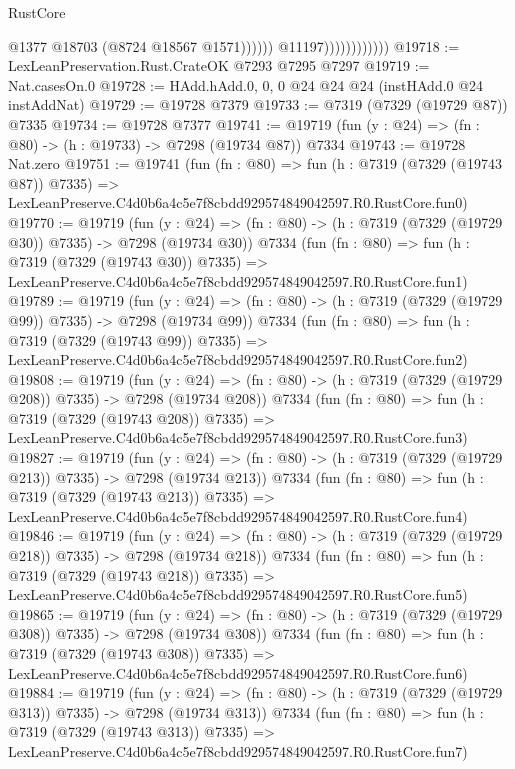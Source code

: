 \begin{lexlean}{RustCore}
\begin{coremodule}
                                      @1377
                                      @18703
                                      (@8724 @18567 @1571))))))
                            @11197))))))))))))
@19718 := LexLeanPreservation.Rust.CrateOK @7293 @7295 @7297
@19719 := Nat.casesOn.{0}
@19728 := HAdd.hAdd.{0, 0, 0} @24 @24 @24 (instHAdd.{0} @24 instAddNat)
@19729 := @19728 @7379
@19733 := @7319 (@7329 (@19729 @87)) @7335
@19734 := @19728 @7377
@19741 := @19719 (fun (y : @24) => (fn : @80) -> (h : @19733) -> @7298 (@19734 @87)) @7334
@19743 := @19728 Nat.zero
@19751 := @19741
    (fun (fn : @80) =>
    fun (h : @7319 (@7329 (@19743 @87)) @7335) =>
    LexLeanPreserve.C4d0b6a4c5e7f8cbdd929574849042597.R0.RustCore.fun0)
@19770 := @19719
    (fun (y : @24) => (fn : @80) -> (h : @7319 (@7329 (@19729 @30)) @7335) -> @7298 (@19734 @30))
    @7334
    (fun (fn : @80) =>
    fun (h : @7319 (@7329 (@19743 @30)) @7335) =>
    LexLeanPreserve.C4d0b6a4c5e7f8cbdd929574849042597.R0.RustCore.fun1)
@19789 := @19719
    (fun (y : @24) => (fn : @80) -> (h : @7319 (@7329 (@19729 @99)) @7335) -> @7298 (@19734 @99))
    @7334
    (fun (fn : @80) =>
    fun (h : @7319 (@7329 (@19743 @99)) @7335) =>
    LexLeanPreserve.C4d0b6a4c5e7f8cbdd929574849042597.R0.RustCore.fun2)
@19808 := @19719
    (fun (y : @24) => (fn : @80) -> (h : @7319 (@7329 (@19729 @208)) @7335) -> @7298 (@19734 @208))
    @7334
    (fun (fn : @80) =>
    fun (h : @7319 (@7329 (@19743 @208)) @7335) =>
    LexLeanPreserve.C4d0b6a4c5e7f8cbdd929574849042597.R0.RustCore.fun3)
@19827 := @19719
    (fun (y : @24) => (fn : @80) -> (h : @7319 (@7329 (@19729 @213)) @7335) -> @7298 (@19734 @213))
    @7334
    (fun (fn : @80) =>
    fun (h : @7319 (@7329 (@19743 @213)) @7335) =>
    LexLeanPreserve.C4d0b6a4c5e7f8cbdd929574849042597.R0.RustCore.fun4)
@19846 := @19719
    (fun (y : @24) => (fn : @80) -> (h : @7319 (@7329 (@19729 @218)) @7335) -> @7298 (@19734 @218))
    @7334
    (fun (fn : @80) =>
    fun (h : @7319 (@7329 (@19743 @218)) @7335) =>
    LexLeanPreserve.C4d0b6a4c5e7f8cbdd929574849042597.R0.RustCore.fun5)
@19865 := @19719
    (fun (y : @24) => (fn : @80) -> (h : @7319 (@7329 (@19729 @308)) @7335) -> @7298 (@19734 @308))
    @7334
    (fun (fn : @80) =>
    fun (h : @7319 (@7329 (@19743 @308)) @7335) =>
    LexLeanPreserve.C4d0b6a4c5e7f8cbdd929574849042597.R0.RustCore.fun6)
@19884 := @19719
    (fun (y : @24) => (fn : @80) -> (h : @7319 (@7329 (@19729 @313)) @7335) -> @7298 (@19734 @313))
    @7334
    (fun (fn : @80) =>
    fun (h : @7319 (@7329 (@19743 @313)) @7335) =>
    LexLeanPreserve.C4d0b6a4c5e7f8cbdd929574849042597.R0.RustCore.fun7)

\end{coremodule}
\end{lexlean}
